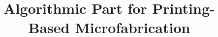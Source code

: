 \documentclass[9pt,conference]{sig-alternate-05-2015}
\begin{document}
\title{Algorithmic Part for Printing-Based Microfabrication}

\maketitle

%
%
%

%
%


{\tiny

}
\end{document}
